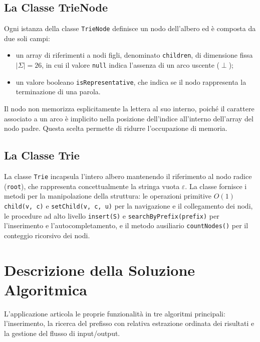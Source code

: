 \documentclass[11pt,a4paper]{article}
\begin{document}
\subsection{La Classe TrieNode}
Ogni istanza della classe \texttt{TrieNode} definisce un nodo dell'albero ed è composta da due soli campi:
\begin{itemize}
    \item un array di riferimenti a nodi figli, denominato \texttt{children}, di dimensione fissa $|\Sigma| = 26$, in cui il valore \texttt{null} indica l'assenza di un arco uscente ($\perp$);
    \item un valore booleano \texttt{isRepresentative}, che indica se il nodo rappresenta la terminazione di una parola.
\end{itemize}
Il nodo non memorizza esplicitamente la lettera al suo interno, poiché il carattere associato a un arco è implicito nella posizione dell'indice all'interno dell'array del nodo padre. Questa scelta permette di ridurre l'occupazione di memoria.

\subsection{La Classe Trie}
La classe \texttt{Trie} incapsula l'intero albero mantenendo il riferimento al nodo radice (\texttt{root}), che rappresenta concettualmente la stringa vuota $\varepsilon$. La classe fornisce i metodi per la manipolazione della struttura: le operazioni primitive $O(1)$ \texttt{child(v, c)} e \texttt{setChild(v, c, u)} per la navigazione e il collegamento dei nodi, le procedure ad alto livello \texttt{insert(S)} e \texttt{searchByPrefix(prefix)} per l'inserimento e l'autocompletamento, e il metodo ausiliario \texttt{countNodes()} per il conteggio ricorsivo dei nodi.


\section{Descrizione della Soluzione Algoritmica}

L'applicazione articola le proprie funzionalità in tre algoritmi principali: l'inserimento, la ricerca del prefisso con relativa estrazione ordinata dei risultati e la gestione del flusso di input/output.
\end{document}
